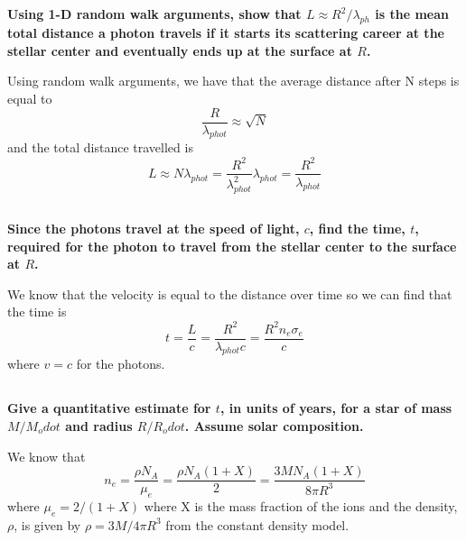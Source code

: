 \subsection{}
\textbf{Using 1-D random walk arguments, show that $L\approx R^2 / \lambda_{ph}$ is the mean total distance a photon travels if it starts its scattering career at the stellar center and eventually ends up at the surface at $R$.}

Using random walk arguments, we have that the average distance after N steps is equal to
\begin{equation*}
    \frac{R}{\lambda_{phot}}\approx\sqrt{N}
\end{equation*}
and the total distance travelled is 
\begin{equation*}
    L \approx N \lambda_{phot} = \frac{R^2}{\lambda_{phot}^2}\lambda_{phot}=\frac{R^2}{\lambda_{phot}}
\end{equation*}

\subsection{}
\textbf{Since the photons travel at the speed of light, $c$, find the time, $t$, required for the photon to travel from the stellar center to the surface at $R$.}

We know that the velocity is equal to the distance over time so we can find that the time is
\begin{equation*}
    t = \frac{L}{c} = \frac{R^2}{\lambda_{phot}c} = \frac{R^2n_e\sigma_e}{c}
\end{equation*}
 where $v=c$ for the photons.

\subsection{}
\textbf{Give a quantitative estimate for $t$, in units of years, for a star of mass $M/M_odot$ and radius $R/R_odot$. Assume solar composition.}

We know that 
\begin{equation}
    n_e = \frac{\rho N_A}{\mu_e} = \frac{\rho N_A (1+X)}{2}=\frac{3MN_A(1+X)}{8\pi R^3}
\end{equation}
where $\mu_e = 2/(1+X)$ where X is the mass fraction of the ions and the density, $\rho$, is given by $\rho = 3 M / 4\pi R^3$ from the constant density model.

